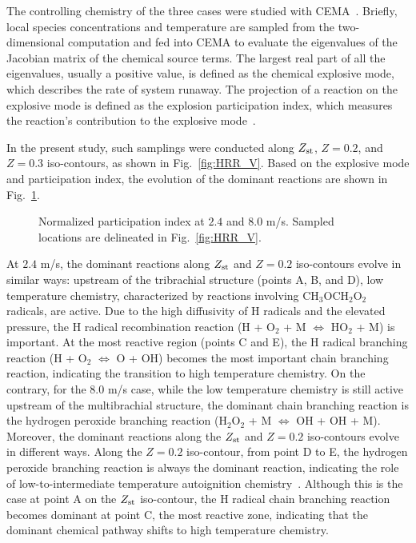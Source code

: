 \documentclass{wssci}
\begin{document}
The controlling chemistry of the three cases were studied with CEMA~\cite{lu10,shan12}.   Briefly, local species concentrations and temperature are sampled from the two-dimensional computation and fed into CEMA to evaluate the eigenvalues of the Jacobian matrix of the chemical source terms.  The largest real part of all the eigenvalues, usually a positive value, is defined as the chemical explosive mode, which describes the rate of system runaway.  The projection of a reaction on the explosive mode is defined as the explosion participation index, which measures the reaction's contribution to the explosive mode~\cite{shan12}.

In the present study, such samplings were conducted along $Z_{\rm st}$, $Z = 0.2$, and $Z = 0.3$ iso-contours, as shown in Fig.~\ref{fig:HRR_V}.  Based on the explosive mode and participation index, the evolution of the dominant reactions are shown in Fig.~\ref{fig:CEMA_V}.

\begin{figure}[t]
  \centering
  \scriptsize
  \vspace{-0.5in}
  \resizebox{0.7\textwidth}{!}{}
  \vspace{-0.2in}
  \resizebox{0.7\textwidth}{!}{}
  \normalsize
  \caption{Normalized participation index at $2.4$ and $8.0$ m/s.  Sampled locations are delineated in Fig.~\ref{fig:HRR_V}.}
  \label{fig:CEMA_V}
\end{figure}

At $2.4$ m/s, the dominant reactions along $Z_{\rm st}$ and $Z = 0.2$ iso-contours evolve in similar ways: upstream of the tribrachial structure (points A, B, and D), low temperature chemistry, characterized by reactions involving CH$_3$OCH$_2$O$_2$ radicals, are active.  Due to the high diffusivity of H radicals and the elevated pressure, the H radical recombination reaction (H + O$_2$ + M $\Longleftrightarrow$ HO$_2$ + M) is important.  At the most reactive region (points C and E), the H radical branching reaction (H + O$_2$ $\Longleftrightarrow$ O + OH) becomes the most important chain branching reaction, indicating the transition to high temperature chemistry.  On the contrary, for the $8.0$ m/s case, while the low temperature chemistry is still active upstream of the multibrachial structure, the dominant chain branching reaction is the hydrogen peroxide branching reaction (H$_2$O$_2$ + M $\Longleftrightarrow$ OH + OH + M).  Moreover, the dominant reactions along the $Z_{\rm st}$ and $Z = 0.2$ iso-contours evolve in different ways.  Along the $Z = 0.2$ iso-contour, from point D to E, the hydrogen peroxide branching reaction is always the dominant reaction, indicating the role of low-to-intermediate temperature autoignition chemistry~\cite{westbrook00}.  Although this is the case at point A on the $Z_{\rm st}$ iso-contour, the H radical chain branching reaction becomes dominant at point C, the most reactive zone, indicating that the dominant chemical pathway shifts to high temperature chemistry.  
\end{document}
